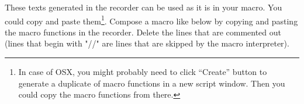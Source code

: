 These texts generated in the recorder can be used as it is in your macro.  You could copy and paste them\footnote{In case of OSX, you might probably need to click ``Create'' button to generate a duplicate of macro functions in a new script window. Then you could copy the macro functions from there.}. Compose a macro like below by copying and pasting the macro functions in the recorder.  Delete the lines that are commented out (lines that begin with "//" are lines that are skipped by the macro interpreter).